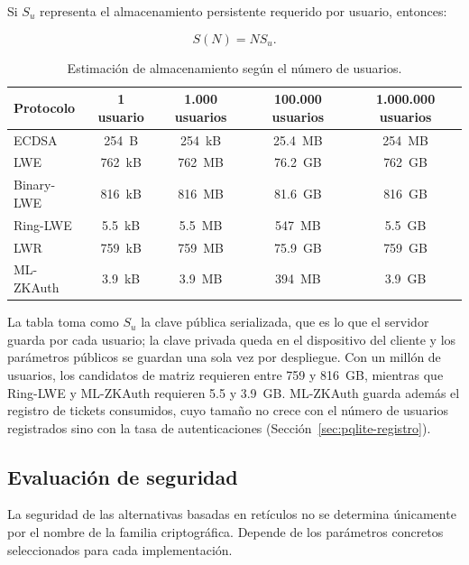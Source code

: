 Si $S_u$ representa el almacenamiento persistente requerido por usuario, entonces:

\begin{equation}
    S(N) = N S_u.
\end{equation}

\begin{table}[H]
\centering
\caption{Estimación de almacenamiento según el número de usuarios.}
\label{tab:storage-scalability}
\small
\begin{tabularx}{\textwidth}{lCCCC}
\toprule
\textbf{Protocolo} &
\textbf{1 usuario} &
\textbf{1.000 usuarios} &
\textbf{100.000 usuarios} &
\textbf{1.000.000 usuarios} \\
\midrule

ECDSA      & 254~B & 254~kB & 25.4~MB & 254~MB \\
LWE        & 762~kB & 762~MB & 76.2~GB & 762~GB \\
Binary-LWE & 816~kB & 816~MB & 81.6~GB & 816~GB \\
Ring-LWE   & 5.5~kB & 5.5~MB & 547~MB & 5.5~GB \\
LWR        & 759~kB & 759~MB & 75.9~GB & 759~GB \\
ML-ZKAuth  & 3.9~kB & 3.9~MB & 394~MB & 3.9~GB \\

\bottomrule
\end{tabularx}
\end{table}

La tabla toma como $S_u$ la clave pública serializada, que es lo que el servidor guarda por cada usuario; la clave privada queda en el dispositivo del cliente y los parámetros públicos se guardan una sola vez por despliegue. Con un millón de usuarios, los candidatos de matriz requieren entre 759 y 816~GB, mientras que Ring-LWE y ML-ZKAuth requieren 5.5 y 3.9~GB. ML-ZKAuth guarda además el registro de tickets consumidos, cuyo tamaño no crece con el número de usuarios registrados sino con la tasa de autenticaciones (Sección~\ref{sec:pqlite-registro}).


\subsection{Evaluación de seguridad}
\label{sec:security-evaluation}

La seguridad de las alternativas basadas en retículos no se determina únicamente por
el nombre de la familia criptográfica. Depende de los parámetros concretos
seleccionados para cada implementación.

